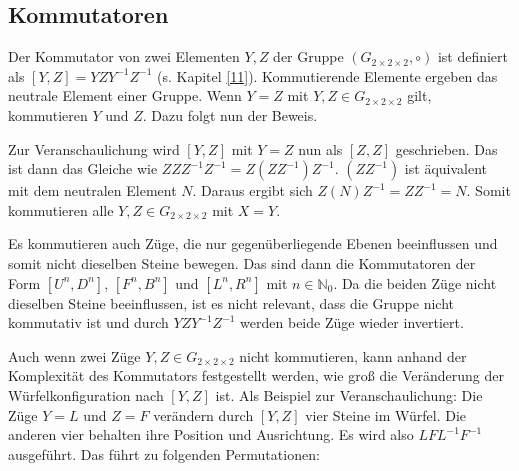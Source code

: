\documentclass[12pt,a4paper, usenames, dvipsnames]{article}
\newcommand{\Gtwo}{\ensuremath{G_{2\times 2\times 2}}}
\begin{document}

%
%
%
%
%
%
%
%
%
%
%
%
%
%
%
%
%
%
%
%
\subsection*{Kommutatoren}

Der Kommutator von zwei Elementen $Y, Z$ der Gruppe $(\Gtwo, \circ)$ ist definiert als $[Y,Z]=YZY^{-1}Z^{-1}$ (s. Kapitel \ref{11}).
Kommutierende Elemente ergeben das neutrale Element einer Gruppe. 
Wenn $Y = Z$ mit $Y, Z \in \Gtwo$ gilt, kommutieren $Y$ und $Z$. 
Dazu folgt nun der Beweis. 

Zur Veranschaulichung wird $[Y,Z]$ mit $Y=Z$ nun als $[Z,Z]$ geschrieben. Das ist dann das Gleiche wie $ZZZ^{-1}Z^{-1} = Z(ZZ^{-1})Z^{-1}$. 
$(ZZ^{-1})$ ist äquivalent mit dem neutralen Element $N$. Daraus ergibt sich $Z(N)Z^{-1} = ZZ^{-1} = N$. 
Somit kommutieren alle $Y, Z \in \Gtwo$ mit $X=Y$.


Es kommutieren auch Züge, die nur gegenüberliegende Ebenen beeinflussen und somit nicht dieselben Steine bewegen. 
Das sind dann die Kommutatoren der Form $[U^n, D^n]$, $[F^n, B^n]$ und $[L^n, R^n]$ mit $n \in \mathbb{N}_0$. 
Da die beiden Züge nicht dieselben Steine beeinflussen, ist es nicht relevant, dass die Gruppe nicht kommutativ ist und durch $YZY^{-1}Z^{-1}$ werden beide Züge wieder invertiert. 


Auch wenn zwei Züge $Y, Z \in \Gtwo$ nicht kommutieren, kann anhand der Komplexität des Kommutators festgestellt werden, wie groß die Veränderung der Würfelkonfiguration nach $[Y, Z]$ ist. 
Als Beispiel zur Veranschaulichung: Die Züge $Y=L$ und $Z=F$ verändern durch $[Y, Z]$ vier Steine im Würfel. Die anderen vier behalten ihre Position und Ausrichtung. 
Es wird also $LFL^{-1}F^{-1}$ ausgeführt. Das führt zu folgenden Permutationen:
\end{document}
